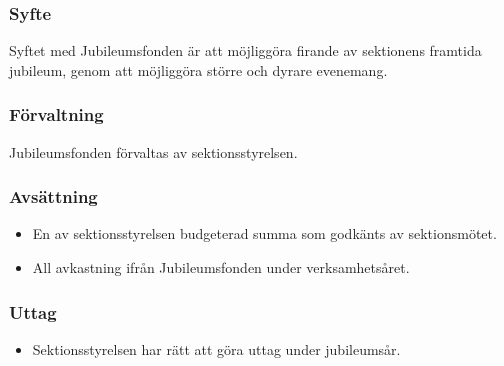 \documentclass[a4paper]{dtek}
\begin{document}
\subsubsection{Syfte}
\label{sec:jubileumfond_syfte}
Syftet med Jubileumsfonden är att möjliggöra firande av sektionens framtida jubileum, genom att möjliggöra större och dyrare evenemang.
\subsubsection{Förvaltning}
Jubileumsfonden förvaltas av sektionsstyrelsen.
\subsubsection{Avsättning}
\begin{itemize}
  \item En av sektionsstyrelsen budgeterad summa som godkänts av sektionsmötet.
  \item All avkastning ifrån Jubileumsfonden under verksamhetsåret.
\end{itemize}
\subsubsection{Uttag}
\begin{itemize}
  \item Sektionsstyrelsen har rätt att göra uttag under jubileumsår.
\end{itemize}
\end{document}

